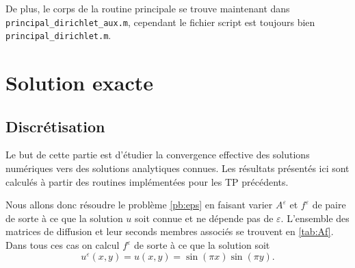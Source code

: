 \message{ !name(rapport.tex)}\documentclass[11pt]{article}
\begin{document}
De plus, le corps de la routine principale se trouve maintenant dans \texttt{principal\_dirichlet\_aux.m}, cependant le fichier script est toujours bien
\texttt{principal\_dirichlet.m}.

\section{Solution exacte}

\subsection{Discrétisation}

Le but de cette partie est d'étudier la convergence effective des solutions numériques vers des solutions analytiques connues. Les résultats présentés ici sont
calculés à partir des routines implémentées pour les TP précédents.

Nous allons donc résoudre le problème \ref{pb:eps} en faisant varier $A^\varepsilon$ et $f^\varepsilon$ de paire de sorte à ce que la solution $u$ soit connue et
ne dépende pas de $\varepsilon$. L'ensemble des matrices de diffusion et leur seconds membres associés se trouvent en \autoref{tab:Af}. Dans tous ces cas on
calcul $f^\varepsilon$ de sorte à ce que la solution soit
\[
  u^\varepsilon(x, y) = u(x, y) = \sin(\pi x)\sin(\pi y).
\]
\end{document}

